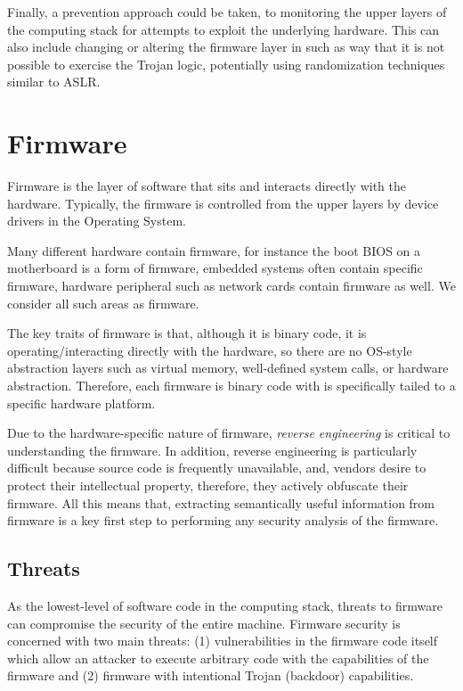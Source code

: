 \documentclass[11pt,letterpaper]{article}
\begin{document}
Finally, a prevention approach could be taken, to monitoring the upper
layers of the computing stack for attempts to exploit the underlying
hardware. This can also include changing or altering the firmware
layer in such as way that it is not possible to exercise the Trojan
logic, potentially using randomization techniques similar to ASLR. 

\section{Firmware}

Firmware is the layer of software that sits and interacts directly
with the hardware. Typically, the firmware is controlled from the
upper layers by device drivers in the Operating System.

Many different hardware contain firmware, for instance the boot BIOS
on a motherboard is a form of firmware, embedded systems often contain
specific firmware, hardware peripheral such as network cards contain
firmware as well. We consider all such areas as firmware.

The key traits of firmware is that, although it is binary code, it is
operating/interacting directly with the hardware, so there are no
OS-style abstraction layers such as virtual memory, well-defined
system calls, or hardware abstraction. Therefore, each firmware is
binary code with is specifically tailed to a specific hardware
platform.

Due to the hardware-specific nature of firmware, \emph{reverse
  engineering} is critical to understanding the firmware. In addition,
reverse engineering is particularly difficult because source code is
frequently unavailable, and, vendors desire to protect their
intellectual property, therefore, they actively obfuscate their
firmware. All this means that, extracting semantically useful
information from firmware is a key first step to performing any
security analysis of the firmware.

\subsection{Threats}

As the lowest-level of software code in the computing stack, threats
to firmware can compromise the security of the entire machine.
Firmware security is concerned with two main threats: (1)
vulnerabilities in the firmware code itself which allow an attacker to
execute arbitrary code with the capabilities of the firmware and (2)
firmware with intentional Trojan (backdoor) capabilities.
\end{document}
